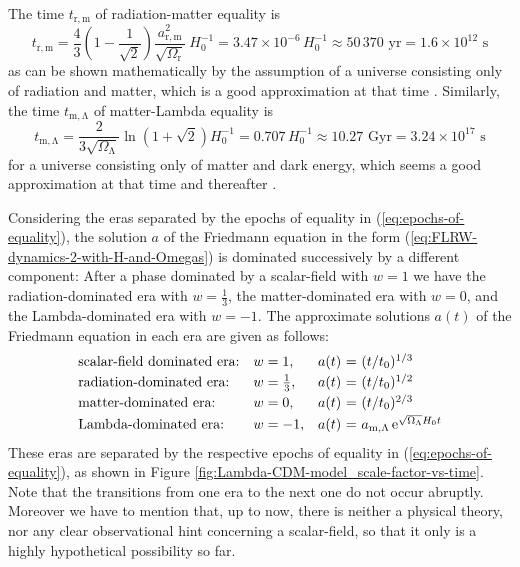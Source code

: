 The time $t_{\mathrm{r,m}}$ of radiation-matter equality is
\begin{equation}
	t_{\mathrm{r,m}}
	= \frac{4}{3} \left( 1 - \frac{1}{\sqrt{2}} \right) 
	\frac{a_{\mathrm{r,m}}^2}{\sqrt{\Omega_{\mathrm{r}}}} \ H_0^{-1}
	= 3.47 \times 10^{-6} \, H_0^{-1}
	\approx 50\,370 \mbox{ yr}
	= 1.6 \times 10^{12} \mbox{ s}
	\label{eq:time-of-radiation-matter-equality}
\end{equation}
as can be shown mathematically by the assumption of a universe consisting only of radiation and matter, which is a good approximation at that time \cite[95]{Ryden-2017}.
Similarly, the time $t_{\mathrm{m,\Lambda}}$ of matter-Lambda equality is
\begin{equation}
	t_{\mathrm{m,\Lambda}}
	= \frac{2}{3 \sqrt{\Omega_{\mathrm{\Lambda}}}} \ln \left( 1 + \sqrt{2} \right) H_0^{-1}
	= 0.707 \, H_0^{-1}
	\approx 10.27 \mbox{ Gyr}
	= 3.24 \times 10^{17} \mbox{ s}
	\label{eq:time-of-matter-Lambda-equality}
\end{equation}
for a universe consisting only of matter and dark energy, which seems a good approximation at that time and thereafter \cite[92]{Ryden-2017}.


Considering the eras separated by the epochs of equality in (\ref{eq:epochs-of-equality}), the solution $a$ of the Friedmann equation in the form (\ref{eq:FLRW-dynamics-2-with-H-and-Omegas}) is dominated successively by a different component: After a phase dominated by a scalar-field with $w = 1$ we have the radiation-dominated era with $w=\frac{1}{3}$, the matter-dominated era with $w=0$, and the Lambda-dominated era with $w=-1$. The approximate solutions $a(t)$ of the Friedmann equation in each era are given as follows: \cite[80-83,91]{Ryden-2017}
\begin{equation}
	\begin{array}{llr@{\ =\ }l}
	\mbox{scalar-field dominated era:} & w=1, & a(t) & ({t}/{t_0})^{1/3}
	\\ [.5ex]
	\mbox{radiation-dominated era:} & w = \frac{1}{3}, & a(t) & ({t}/{t_0})^{1/2}
	\\ [.5ex]
	\mbox{matter-dominated era:} & w = 0, & a(t) & ({t}/{t_0})^{2/3}
	\\ [.5ex]
	\mbox{Lambda-dominated era:} & w = -1, & a(t) & a_{\mathrm{m,\Lambda}} \E^{\sqrt{\Omega_{\mathrm{\Lambda}}} H_0 t}	
	\end{array}
	\label{eq:scale-factor-in-different-eras}
\end{equation}
These eras are separated by the respective epochs of equality in (\ref{eq:epochs-of-equality}), as shown in Figure \ref{fig:Lambda-CDM-model_scale-factor-vs-time}.
Note that the transitions from one era to the next one do not occur abruptly. Moreover we have to mention that, up to now, there is neither a physical theory, nor any clear observational hint concerning a scalar-field, so that it only is a highly hypothetical possibility so far.


